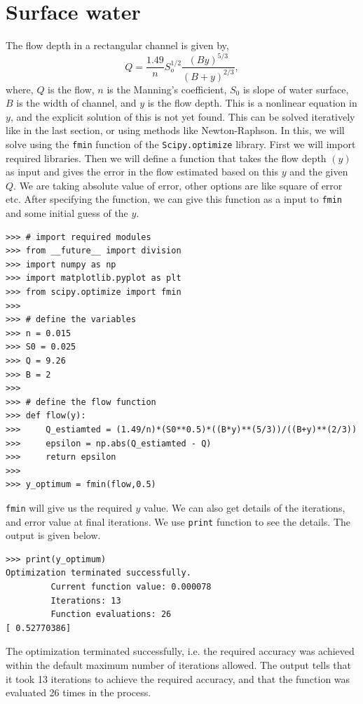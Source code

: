 \documentclass[10pt]{book}
\begin{document}
{\section{Surface water}
The flow depth in a rectangular channel is given by,
\begin{equation}
Q = \frac{1.49}{n}S_o^{1/2}\frac{(By)^{5/3}}{(B+y)^{2/3}},
\end{equation}
where, $Q$ is the flow, $n$ is the Manning's coefficient, $S_0$ is slope of water surface, $B$ is the width of channel, and $y$ is the flow depth. This is a nonlinear equation in $y$, and the explicit solution of this is not yet found. This can be solved iteratively like in the last section, or using methods like Newton-Raphson. In this, we will solve using the \verb"fmin" function of the \verb"Scipy.optimize" library. First we will import required libraries. Then we will define a function that takes the flow depth $(y)$ as input and gives the error in the flow estimated based on this $y$ and the given $Q$. We are taking absolute value of error, other options are like square of error etc. After specifying the function, we can give this function as a input to \verb"fmin" and some initial guess of the $y$.  
\beforeverb \begin{verbatim}
>>> # import required modules
>>> from __future__ import division
>>> import numpy as np
>>> import matplotlib.pyplot as plt
>>> from scipy.optimize import fmin
>>> 
>>> # define the variables
>>> n = 0.015
>>> S0 = 0.025
>>> Q = 9.26
>>> B = 2
>>> 
>>> # define the flow function
>>> def flow(y):
>>>     Q_estiamted = (1.49/n)*(S0**0.5)*((B*y)**(5/3))/((B+y)**(2/3))
>>>     epsilon = np.abs(Q_estiamted - Q)
>>>     return epsilon
>>> 
>>> y_optimum = fmin(flow,0.5)
\end{verbatim} \afterverb
\verb"fmin" will give us the required $y$ value. We can also get details of the iterations, and error value at final iterations. We use \verb"print" function to see the details. The output is given below. 
\beforeverb \begin{verbatim}
>>> print(y_optimum)
Optimization terminated successfully.
         Current function value: 0.000078
         Iterations: 13
         Function evaluations: 26
[ 0.52770386]
\end{verbatim} \afterverb
The optimization terminated successfully, i.e. the required accuracy was achieved within the default maximum number of iterations allowed. The output tells that it took 13 iterations to achieve the required accuracy, and that the function was evaluated 26 times in the process. 

}
\end{document}
